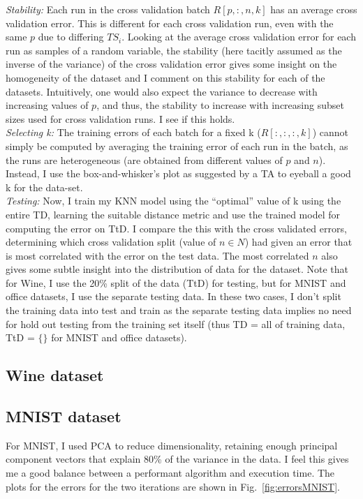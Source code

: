 \documentclass[5pt]{article}
\begin{document}
\noindent \emph{Stability:} Each run in the cross validation batch $R[p,:,n,k]$
has an average cross validation error. This is different for each cross
validation run, even with the same $p$ due to differing $TS_i$. Looking at the
average cross validation error for each run as samples of a random variable,
the stability (here tacitly assumed as the inverse of the variance) of the
cross validation error gives some insight on the homogeneity of the dataset and
I comment on this stability for each of the datasets. Intuitively, one would
also expect the variance to decrease with increasing values of $p$, and thus,
the stability to increase with increasing subset sizes used for cross
validation runs. I see if this holds.\\

\noindent \emph{Selecting k:}
The training errors of each batch for a fixed k ($R[:,:,:,k]$) cannot simply be
computed by averaging the training error of each run in the batch, as the runs
are heterogeneous (are obtained from different values of $p$ and $n$). Instead,
I use the box-and-whisker's plot as suggested by a TA to eyeball a good k for
the data-set.\\

\noindent \emph{Testing:}
Now, I train my KNN model using the ``optimal'' value of k using the
entire TD, learning the suitable distance metric and use the trained model for
computing the error on TtD. I compare the this with the cross validated errors,
determining which cross validation split (value of $n \in N$) had given an error
that is most correlated with the error on the test data. The most correlated
$n$ also gives some subtle insight into the distribution of data for the
dataset. Note that for Wine, I use the 20\% split of the data (TtD) for
testing, but for MNIST and office datasets, I use the separate testing data. In
these two cases, I don't split the training data into test and train as the
separate testing data implies no need for hold out testing from the training
set itself (thus TD = all of training data, TtD = $\{\}$ for MNIST and office
datasets).

\subsection{Wine dataset}

\subsection{MNIST dataset}
For MNIST, I used PCA to reduce dimensionality, retaining enough principal
component vectors that explain 80\% of the variance in the data. I feel this
gives me a good balance between a performant algorithm and execution time. The
plots for the errors for the two iterations are shown in
Fig.~\ref{fig:errorsMNIST}.
\end{document}
